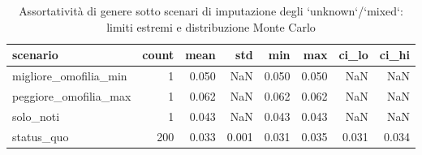 \begin{table}
\centering
\caption{Assortatività di genere sotto scenari di imputazione degli `unknown`/`mixed`: limiti estremi e distribuzione Monte Carlo}
\label{tab:t5_montecarlo_genere}
\begin{tabular}{lrrrrrrr}
\toprule
             scenario &  count &  mean &   std &   min &   max &  ci\_lo &  ci\_hi \\
\midrule
migliore\_omofilia\_min &      1 & 0.050 &   NaN & 0.050 & 0.050 &    NaN &    NaN \\
peggiore\_omofilia\_max &      1 & 0.062 &   NaN & 0.062 & 0.062 &    NaN &    NaN \\
            solo\_noti &      1 & 0.043 &   NaN & 0.043 & 0.043 &    NaN &    NaN \\
           status\_quo &    200 & 0.033 & 0.001 & 0.031 & 0.035 &  0.031 &  0.034 \\
\bottomrule
\end{tabular}
\end{table}
